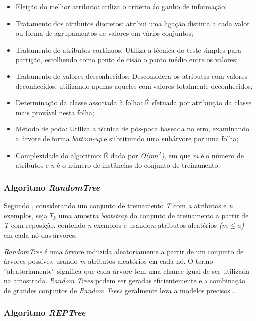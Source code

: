 \documentclass[
	12pt,				%
	openright,			%
	oneside,	
	a4paper,				%
	english,				%
	brazil				%
]{abntex2/abntex2} %
\begin{document}
	\begin{itemize}
		\item Eleição do melhor atributo: utiliza o critério do ganho de informação;
		\item Tratamento dos atributos discretos: atribui uma ligação distinta a cada valor ou forma de agrupamentos de valores em vários conjuntos;
		\item Tratamento de atributos contínuos: Utiliza a técnica do teste simples para partição, escolhendo como ponto de cisão o ponto médio entre os valores;
		\item Tratamento de valores desconhecidos: Desconsidera os atributos com valores deconhecidos, utilizando apenas aqueles com valores totalmente deconhecidos;
		\item Determinação da classe associada à folha: É efetuada por atribuição da classe mais provável nesta folha;
		\item Método de poda: Utiliza a técnica de pós-poda baseada no erro, examinando a árvore de forma \textit{bottom-up} e subtituindo uma subárvore por uma folha;
		\item Complexidade do algoritmo: É dada por \textit{O($mn^{2}$)}, em que \textit{m} é o número de atributos e \textit{n} é o número de instâncias do conjunto de treinamento. 
	\end{itemize}

	\subsubsection{Algoritmo \textit{RandomTree}}
	
	Segundo \cite{oshiro:2013}, considerando um conjunto de treinamento \textit{T} com \textit{a} atributos e \textit{n} exemplos, seja \textit{$T_k$} uma amostra \textit{bootstrap} do conjunto de treinamento a partir de \textit{T} com reposição, contendo \textit{n} exemplos e usando\textit{m} atributos aleatórios \textit{($m\le a$)} em cada nó das árvores.
	
	\textit{RandomTree} é uma árvore induzida aleatoriamente a partir de um conjunto de árvores possíves, usando \textit{m} atributos aleatórios em cada nó. O termo ''aleatoriamente'' significa que cada árvore tem uma chance igual de ser utilizada na amostrada. \textit{Random Trees} podem ser geradas eficientemente e a combinação de grandes conjuntos de \textit{Random Trees} geralmente leva a modelos precisos \cite{zhao:2008}.
	
	\subsubsection{Algoritmo \textit{REPTree}}
	
\end{document}
